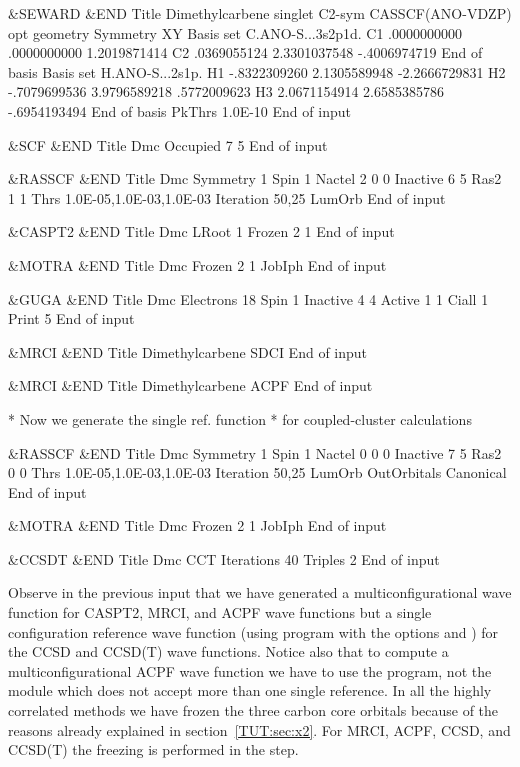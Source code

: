 \begin{inputlisting}
 &SEWARD &END
Title
 Dimethylcarbene singlet C2-sym
 CASSCF(ANO-VDZP) opt geometry
Symmetry
 XY
Basis set
C.ANO-S...3s2p1d.
C1              .0000000000         .0000000000        1.2019871414
C2              .0369055124        2.3301037548        -.4006974719
End of basis
Basis set
H.ANO-S...2s1p.
H1             -.8322309260        2.1305589948       -2.2666729831
H2             -.7079699536        3.9796589218         .5772009623
H3             2.0671154914        2.6585385786        -.6954193494
End of basis
PkThrs
 1.0E-10
End of input

 &SCF &END
Title
Dmc
Occupied
7 5
End of input

 &RASSCF &END
Title
Dmc
Symmetry 
 1
Spin
 1
Nactel
 2  0  0
Inactive
 6  5
Ras2  
 1  1
Thrs
1.0E-05,1.0E-03,1.0E-03
Iteration
50,25
LumOrb
End of input

 &CASPT2 &END
Title
Dmc
LRoot
1
Frozen
 2  1
End of input

 &MOTRA &END
Title
Dmc
Frozen
 2  1
JobIph
End of input

 &GUGA &END
Title
Dmc
Electrons
18
Spin
 1
Inactive
 4  4
Active
 1  1
Ciall
 1
Print
 5
End of input

 &MRCI &END
Title
Dimethylcarbene
SDCI
End of input

 &MRCI &END
Title
Dimethylcarbene
ACPF
End of input

* Now we generate the single ref. function
* for coupled-cluster calculations

 &RASSCF &END
Title
Dmc
Symmetry
 1
Spin
 1
Nactel
 0  0  0
Inactive
 7  5
Ras2
 0  0
Thrs
1.0E-05,1.0E-03,1.0E-03
Iteration
50,25
LumOrb
OutOrbitals
 Canonical
End of input

 &MOTRA &END
Title
Dmc
Frozen
 2  1
JobIph
End of input

 &CCSDT &END
Title
 Dmc 
CCT
Iterations
 40
Triples
 2
End of input
\end{inputlisting}


Observe in the previous input that we have generated a multiconfigurational
wave function for CASPT2, MRCI, and ACPF wave functions but a single configuration
reference wave function (using  program with the options
 and ) 
for the CCSD and CCSD(T) wave functions. Notice also
that to compute a multiconfigurational ACPF wave function we have to use
the  program, not the  module which does not accept
more than one single reference. In all the highly correlated
methods we have frozen the three carbon core orbitals because of the reasons
already explained in section~\ref{TUT:sec:x2}. For MRCI, ACPF, CCSD, and CCSD(T)
the freezing is performed in the  step.

